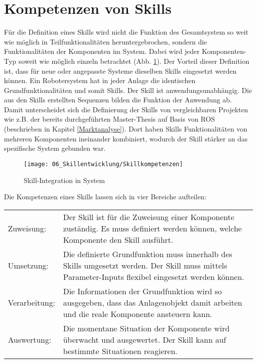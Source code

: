 \section{Kompetenzen von Skills} \label{Skillkompetenzen}
	Für die Definition eines Skills wird nicht die Funktion des Gesamtsystem so weit wie möglich in Teilfunktionalitäten heruntergebrochen, sondern die Funktionalitäten der Komponenten im System. Dabei wird jeder Komponenten-Typ soweit wie möglich einzeln betrachtet (Abb. \ref{fig:Skillintegration}). Der Vorteil dieser Definition ist, dass für neue oder angepasste Systeme dieselben Skills eingesetzt werden können. Ein Robotersystem hat in jeder Anlage die identischen Grundfunktionalitäten und somit Skills. Der Skill ist anwendungsunabhängig. Die aus den Skills erstellten Sequenzen bilden die Funktion der Anwendung ab. Damit unterscheidet sich die Definierung der Skills von vergleichbaren Projekten wie z.B. der bereits durchgeführten Master-Thesis auf Basis von ROS (beschrieben in Kapitel \ref{Marktanalyse}). Dort haben Skills Funktionalitäten von mehreren Komponenten ineinander kombiniert, wodurch der Skill stärker an das spezifische System gebunden war.
	\begin{figure}[h!]
		\centering
		\texttt{[image: 06\_Skillentwicklung/Skillkompetenzen]}
		\captionsetup{justification=centering}
		\caption{Skill-Integration in System}
		\label{fig:Skillintegration}
	\end{figure}
	
	Die Kompetenzen eines Skills lassen sich in vier Bereiche aufteilen: 
	
	\begin{tabularx}{\textwidth}{@{}>{}p{8em} X@{}}
		Zuweisung: & 
		Der Skill ist für die Zuweisung einer Komponente zuständig. Es muss definiert werden können, welche Komponente den Skill ausführt.
		\\
		Umsetzung: & 
		Die definierte Grundfunktion muss innerhalb des Skills umgesetzt werden. Der Skill muss mittels Parameter-Inputs flexibel eingesetzt werden können.
		\\
		Verarbeitung: & 
		Die Informationen der Grundfunktion wird so ausgegeben, dass das Anlagenobjekt damit arbeiten und die reale Komponente ansteuern kann.
		\\
		Auswertung: & 
		Die momentane Situation der Komponente wird überwacht und ausgewertet. Der Skill kann auf bestimmte Situationen reagieren. 
		\\
	\end{tabularx}